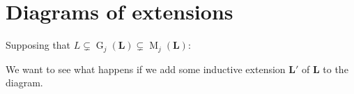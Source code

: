 \documentclass[runningheads]{llncs}
\renewcommand{\L}{\mathbf{L}}
\DeclareMathOperator{\Glivenko}{G}
\DeclareMathOperator{\Kleisli}{K}
\DeclareMathOperator{\Maximal}{M}
\begin{document}
\section{Diagrams of extensions}
\label{append-diagrams}

Supposing that $L\subsetneq\Glivenko_j(\L)\subsetneq\Maximal_j(\L)$:
\begin{center}
\end{center}
We want to see what happens if we add some inductive extension $\L'$ of $\L$ to the diagram.
\end{document}
